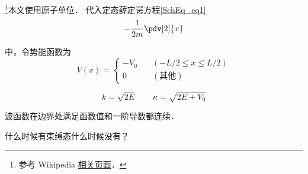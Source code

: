 




\footnote{参考 Wikipedia \href{https://en.wikipedia.org/wiki/Finite_potential_well}{相关页面}．}本文使用原子单位． 代入定态薛定谔方程\autoref{SchEq_eq1}~
\begin{equation}
-\frac{1}{2m}\pdv[2]{x}
\end{equation}

中，令势能函数为
\begin{equation}
V(x) = \begin{cases}
-V_0 \quad &(-L/2 \leqslant x \leqslant L/2)\\
0 \quad &(\text{其他})
\end{cases}
\end{equation}

\begin{equation}
k = \sqrt{2E} \qquad \kappa = \sqrt{2E + V_0}
\end{equation}



波函数在边界处满足函数值和一阶导数都连续．

什么时候有束缚态什么时候没有？
